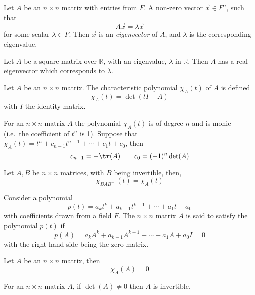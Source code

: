 \begin{definition}
  Let $A$ be an $n \times n$ matrix with entries from $F$. A non-zero
  vector $\vec{x} \in F^n$, such that \[A \vec{x} = \lambda \vec{x} \]
  for some scalar $\lambda \in F$. Then $\vec{x}$ is an
  \emph{eigenvector} of $A$, and $\lambda$ is the corresponding
  eigenvalue.
\end{definition}

\begin{lemma}
  Let $A$ be a square matrix over $\mathbb{R}$, with an eigenvalue,
  $\lambda$ in $\mathbb{R}$. Then $A$ has a real eigenvector which
  corresponds to $\lambda$.
\end{lemma}


\begin{definition}
  Let $A$ be an $n \times n$ matrix. The characteristic polynomial
  $\chi_A (t)$ of $A$ is defined
  \[ \chi_A (t) = \det (t I - A) \] with $I$ the identity matrix.
\end{definition}

\begin{lemma}
  For an $n \times n$ matrix $A$ the polynomial $\chi_A (t)$ is of
  degree $n$ and is monic (i.e.\ the coefficient of $t^n$ is
  1). Suppose that $\chi_A (t) = t^n + c_{n-1} t^{n-1} + \cdots + c_1
  t + c_0$, then
  \[ c_{n-1} = - \tr(A) \qquad c_0 = (-1)^n \det(A) \]
\end{lemma}

\begin{lemma}
  Let $A, B$ be $n \times n$ matrices, with $B$ being invertible, then,
  \[\chi_{BAB^{-1}}(t)  = \chi_A (t)\]
\end{lemma}

\begin{definition}
  Consider a polynomial
  \[ p(t) = a_k t^k + a_{k-1} t^{k-1} + \cdots + a_1 t + a_0 \] with
  coefficients drawn from a field $F$. The $n \times n$ matrix $A$ is
  said to satisfy the polynomial $p(t)$ if
  \[ p(A) = a_k A^k + a_{k-1} A^{k-1} + \cdots + a_1 A + a_0 I = 0 \]
  with the right hand side being the zero matrix.
\end{definition}

\begin{theorem}
  Let $A$ be an $n \times n$ matrix, then \[\chi_A(A) = 0 \]
\end{theorem}

\begin{corollary}
  For an $n \times n$ matrix $A$, if $\det(A) \neq 0$ then $A$ is
  invertible.
\end{corollary}

